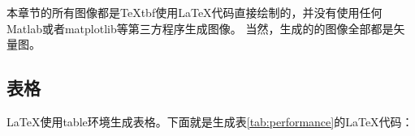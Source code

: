 \documentclass[UTF8, fontset=windows]{ctexart}
\numberwithin{equation}{section} %
\numberwithin{table}{section} %
\begin{document}
%

本章节的所有图像都是\TeX tbf{使用\LaTeX  代码直接绘制的}，并没有使用任何Matlab或者matplotlib等第三方程序生成图像。
当然，生成的的图像全部都是矢量图。

\subsection{表格}
\LaTeX 使用table环境生成表格。下面就是生成表\ref{tab:performance}的\LaTeX 代码：
\end{document}
